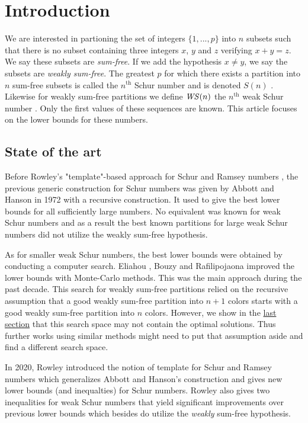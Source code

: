 \section{Introduction}

\qquad We are interested in partioning the set of integers \(\{1, ..., p\}\) into \(n\) subsets such that there is no 
subset containing three integers \(x\), \(y\) and \(z\) verifying \(x + y = z\). We say these subsets are 
\textit{sum-free}. If we add the hypothesis \(x \neq y\), we say the subsets are \textit{weakly sum-free}. The 
greatest \(p\) for which there exists a partition into \(n\) sum-free subsets is called the \(n^{\text{th}}\) Schur 
number and is denoted \(S(n)\) \cite{Schur1917}. Likewise for weakly sum-free partitions we define \(\mathit{WS}(n)\) 
the \(n^{\text{th}}\) weak Schur number \cite{Irving1973}. Only the first values of these sequences are known. 
This article focuses on the lower bounds for these numbers.


\subsection{State of the art}

\qquad Before Rowley's "template"-based approach for Schur and Ramsey numbers \cite{RowleyRamsey}, the 
previous generic construction for Schur numbers was given by Abbott and Hanson \cite{AbbottHanson} in 1972 
with a recursive construction. It used to give the best lower bounds for all sufficiently large numbers. No equivalent 
was known for weak Schur numbers and as a result the best known partitions for large weak Schur numbers 
did not utilize the weakly sum-free hypothesis. 

\par
As for smaller weak Schur numbers, the best lower bounds were obtained by conducting a computer search. Eliahou 
\cite{EliahouBook}, Bouzy \cite{Bouzy2015AnAP} and Rafilipojaona \cite{Rafilipojaona} improved the lower 
bounds with Monte-Carlo methods. This was the main approach during the past decade. This search for weakly 
sum-free partitions relied on the recursive assumption that a good weakly sum-free partition into \(n+1\) colors 
starts with a good weakly sum-free partition into \(n\) colors. 
However, we show in the \hyperref[SearchSpace]{last section} that this search space may not contain the optimal 
solutions. Thus further works using similar methods might need to put that assumption aside and find a different 
search space.

\par
In 2020, Rowley introduced the notion of template for Schur and Ramsey numbers \cite{RowleyRamsey} which 
generalizes Abbott and Hanson's construction and gives new lower bounds (and inequalties) for Schur numbers. 
Rowley also gives two inequalities for weak Schur numbers \cite{RowleyWS} that yield significant improvements 
over previous lower bounds which besides do utilize the \textit{weakly} sum-free hypothesis.

